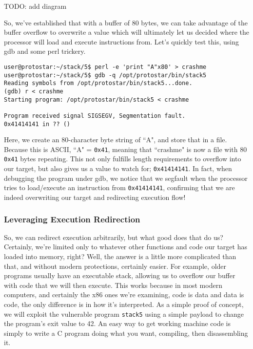 TODO: add diagram

So, we've established that with a buffer of 80 bytes, we can take advantage of the buffer overflow
to overwrite a value which will ultimately let us decided where the processor will load and
execute instructions from. Let's quickly test this, using gdb and some perl trickery.

\begin{lstlisting}
user@protostar:~/stack/5$ perl -e 'print "A"x80' > crashme
user@protostar:~/stack/5$ gdb -q /opt/protostar/bin/stack5
Reading symbols from /opt/protostar/bin/stack5...done.
(gdb) r < crashme
Starting program: /opt/protostar/bin/stack5 < crashme

Program received signal SIGSEGV, Segmentation fault.
0x41414141 in ?? ()
\end{lstlisting}
Here, we create an 80-character byte string of ``A", and store that in a file. Because this is ASCII,
``A" = \texttt{0x41}, meaning that ``crashme" is now a file with 80 \texttt{0x41} bytes repeating. This
not only fulfills length requirements to overflow into our target, but also gives us a value to
watch for; \texttt{0x41414141}. In fact, when debugging the program under gdb, we notice that
we segfault when the processor tries to load/execute an instruction from \texttt{0x41414141}, confirming
that we are indeed overwriting our target and redirecting execution flow!

\subsubsection{Leveraging Execution Redirection}
So, we can redirect execution arbitrarily, but what good does that do us? Certainly, we're limited only to
whatever other functions and code our target has loaded into memory, right? Well, the answer is a little
more complicated than that, and without modern protections, certainly easier. For example, older
programs usually have an executable stack, allowing us to overflow our buffer with code that we will
then execute. This works because in most modern computers, and certainly the x86 ones we're examining,
code is data and data is code, the only difference is in how it's interpreted. 
As a simple proof of concept, we will exploit the vulnerable program \texttt{stack5}
using a simple payload to change the program's exit value to 42. An easy way to get working machine
code is simply to write a C program doing what you want, compiling, then disassembling it.



